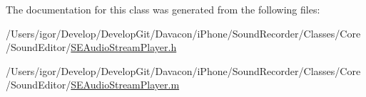 The documentation for this class was generated from the following files\-:\begin{DoxyCompactItemize}
\item 
/\-Users/igor/\-Develop/\-Develop\-Git/\-Davacon/i\-Phone/\-Sound\-Recorder/\-Classes/\-Core/\-Sound\-Editor/\hyperlink{_s_e_audio_stream_player_8h}{S\-E\-Audio\-Stream\-Player.\-h}\item 
/\-Users/igor/\-Develop/\-Develop\-Git/\-Davacon/i\-Phone/\-Sound\-Recorder/\-Classes/\-Core/\-Sound\-Editor/\hyperlink{_s_e_audio_stream_player_8m}{S\-E\-Audio\-Stream\-Player.\-m}\end{DoxyCompactItemize}
